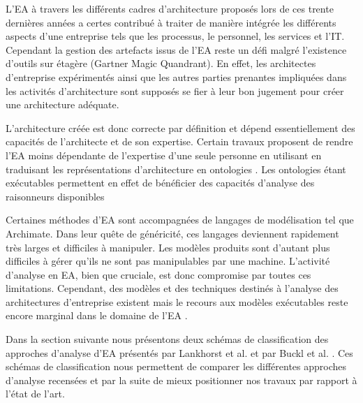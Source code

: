 L'EA à travers les différents cadres d'architecture proposés lors de ces trente dernières années a certes contribué à traiter de manière intégrée les différents aspects d'une entreprise tels que les processus, le personnel, les services et l'IT. Cependant la gestion des artefacts issus de l'EA reste un défi \cite{zachman1997enterprise} malgré l'existence d'outils sur étagère (Gartner Magic Quandrant). En effet, les architectes d'entreprise expérimentés ainsi que les autres parties prenantes impliquées dans les activités d'architecture sont supposés se fier à leur bon jugement pour créer une architecture adéquate. 

L'architecture créée est donc correcte par définition et dépend essentiellement des capacités de l'architecte et de son expertise. Certain travaux proposent de rendre l'EA moins dépendante de l'expertise d'une seule personne en utilisant en traduisant les représentations d'architecture en ontologies \cite{sunkle_analyzing_2013}. Les ontologies étant exécutables permettent en effet de bénéficier des capacités d'analyse des raisonneurs disponibles 

Certaines méthodes d'EA sont accompagnées de langages de modélisation tel que Archimate. Dans leur quête de généricité, ces langages deviennent rapidement très larges et difficiles à manipuler. Les modèles produits sont d'autant plus difficiles à gérer qu'ils ne sont pas manipulables par une machine. L'activité d'analyse en EA, bien que cruciale, est donc compromise par toutes ces limitations. Cependant, des modèles et des techniques destinés à l'analyse des architectures d'entreprise existent mais le recours aux modèles exécutables reste encore marginal dans le domaine de l'EA \cite{kulkarni2013modelling}.


Dans la section suivante nous présentons deux schémas de classification des approches d'analyse d'EA présentés par Lankhorst et al. \cite{lankhorst2013enterprise} et par Buckl et al. \cite{buckl2009classifying}. Ces schémas de classification nous permettent de comparer les différentes approches d'analyse recensées et par la suite de mieux positionner nos travaux par rapport à l'état de l'art.



